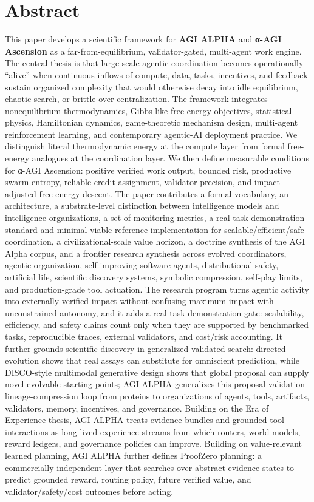 \documentclass[11pt]{article}
\begin{document}
\section{Abstract}\label{abstract}

This paper develops a scientific framework for \textbf{AGI ALPHA} and
\textbf{α-AGI Ascension} as a far-from-equilibrium, validator-gated,
multi-agent work engine. The central thesis is that large-scale agentic
coordination becomes operationally ``alive'' when continuous inflows of
compute, data, tasks, incentives, and feedback sustain organized
complexity that would otherwise decay into idle equilibrium, chaotic
search, or brittle over-centralization. The framework integrates
nonequilibrium thermodynamics, Gibbs-like free-energy objectives,
statistical physics, Hamiltonian dynamics, game-theoretic mechanism
design, multi-agent reinforcement learning, and contemporary agentic-AI
deployment practice. We distinguish literal thermodynamic energy at the
compute layer from formal free-energy analogues at the coordination
layer. We then define measurable conditions for α-AGI Ascension:
positive verified work output, bounded risk, productive swarm entropy,
reliable credit assignment, validator precision, and impact-adjusted
free-energy descent. The paper contributes a formal vocabulary, an
architecture, a substrate-level distinction between intelligence models
and intelligence organizations, a set of monitoring metrics, a real-task
demonstration standard and minimal viable reference implementation for
scalable/efficient/safe coordination, a civilizational-scale value
horizon, a doctrine synthesis of the AGI Alpha corpus, and a frontier
research synthesis across evolved coordinators, agentic organization,
self-improving software agents, distributional safety, artificial life,
scientific discovery systems, symbolic compression, self-play limits,
and production-grade tool actuation. The research program turns agentic
activity into externally verified impact without confusing maximum
impact with unconstrained autonomy, and it adds a real-task
demonstration gate: scalability, efficiency, and safety claims count
only when they are supported by benchmarked tasks, reproducible traces,
external validators, and cost/risk accounting. It further grounds
scientific discovery in generalized validated search: directed evolution
shows that real assays can substitute for omniscient prediction, while
DISCO-style multimodal generative design shows that global proposal can
supply novel evolvable starting points; AGI ALPHA generalizes this
proposal-validation-lineage-compression loop from proteins to
organizations of agents, tools, artifacts, validators, memory,
incentives, and governance. Building on the Era of Experience thesis, AGI ALPHA treats evidence bundles and grounded tool interactions as long-lived experience streams from which routers, world models, reward ledgers, and governance policies can improve. Building on value-relevant learned planning, AGI ALPHA further defines ProofZero planning: a commercially independent layer that searches over abstract evidence states to predict grounded reward, routing policy, future verified value, and validator/safety/cost outcomes before acting.
\end{document}
